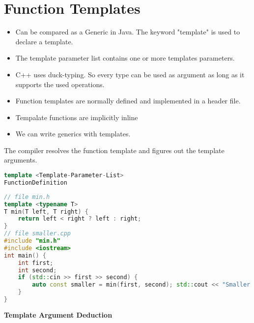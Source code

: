 
\section{Function Templates}
\begin{itemize}
  \itemsep -0.5em 
  \item Can be compared as a Generic in Java. The keyword "template" is used to declare a template.
  \item The template parameter list contains one or more templates parameters.
  \item C++ uses duck-typing. So every type can be used as argument as long as it supports the used operations.
  \item Function templates are normally defined and implemented in a header file.
  \item Tempalate functions are implicitly inline
  \item We can write generics with templates.
\end{itemize}

The compiler resolves the function template and figures out the template arguments. 
\begin{lstlisting}[language=C++]
template <Template-Parameter-List>
FunctionDefinition
\end{lstlisting}

\begin{lstlisting}[language=C++]
// file min.h
template <typename T>
T min(T left, T right) {
	return left < right ? left : right;
}
// file smaller.cpp
#include "min.h"
#include <iostream>
int main() {
	int first;
	int second;
	if (std::cin >> first >> second) {
		auto const smaller = min(first, second); std::cout << "Smaller of " << first << " and " << second << " is: " << smaller << '\n';
	}
}
\end{lstlisting}

\textbf{Template Argument Deduction}


